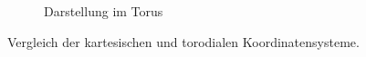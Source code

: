 \begin{figure}
\begin{subfigure}[b]{0.49\textwidth}
                \caption{Darstellung im Torus}
                \label{fig:vergleich_torus}
        \end{subfigure}
        \caption{Vergleich der kartesischen und torodialen Koordinatensysteme.}
        \label{fig:vergleich_systeme}
\end{figure}

